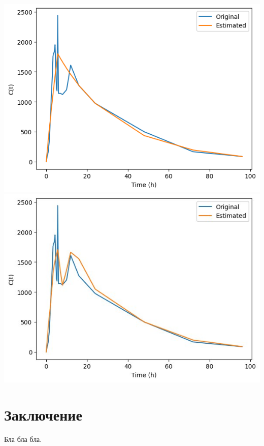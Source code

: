 \documentclass[oneside,senior,etd]{BYUPhys}
\begin{document}
\begin{minipage}{0.45\linewidth}
	\includegraphics[width=2.0\linewidth]{results/basic_6.png}\newline
	\includegraphics[width=2.0\linewidth]{results/6.jpg}\newline
\end{minipage}

\section{Заключение}

Бла бла бла.

\raggedright



\end{document}
